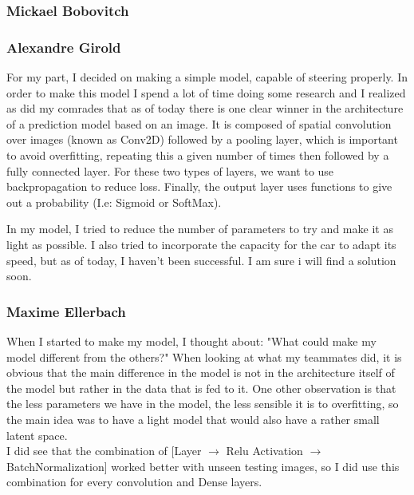 \documentclass[12pt]{article}
\begin{document}
\subsubsection{Mickael Bobovitch}
\subsubsection{Alexandre Girold}
For my part, I decided on making a simple model, capable of steering properly. In order to make this model I spend a lot of time doing some research and I realized as did my comrades that as of today there is one clear winner in the architecture of a prediction model based on an image. 
It is composed of spatial convolution over images (known as Conv2D) followed by a pooling layer, which is important to avoid overfitting, repeating this a given number of times then followed by a fully connected layer. For these two types of layers, we want to use backpropagation to reduce loss. Finally, the output layer uses functions to give out a probability (I.e: Sigmoid or SoftMax).  

In my model, I tried to reduce the number of parameters to try and make it as light as possible. I also tried to incorporate the capacity for the car to adapt its speed, but as of today, I haven’t been successful. I am sure i will find a solution soon.

\subsubsection{Maxime Ellerbach}
When I started to make my model, I thought about: "What could make my model different from the others?" When looking at what my teammates did, it is obvious that the main difference in the model is not in the architecture itself of the model but rather in the data that is fed to it. One other observation is that the less parameters we have in the model, the less sensible it is to overfitting, so the main idea was to have a light model that would also have a rather small latent space. \\

I did see that the combination of [Layer $\rightarrow$ Relu Activation $\rightarrow$ BatchNormalization] worked better with unseen testing images, so I did use this combination for every convolution and Dense layers. \\

\newpage
\end{document}
